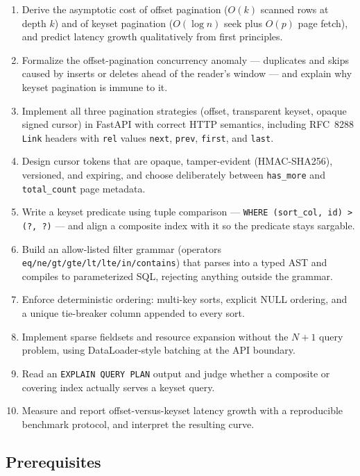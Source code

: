 \begin{enumerate}[label=\textbf{LO-\arabic*.}]
  \item Derive the asymptotic cost of offset pagination ($O(k)$ scanned rows
        at depth $k$) and of keyset pagination ($O(\log n)$ seek plus $O(p)$
        page fetch), and predict latency growth qualitatively from first
        principles.
  \item Formalize the offset-pagination concurrency anomaly --- duplicates
        and skips caused by inserts or deletes ahead of the reader's window
        --- and explain why keyset pagination is immune to it.
  \item Implement all three pagination strategies (offset, transparent
        keyset, opaque signed cursor) in FastAPI with correct HTTP semantics,
        including RFC~8288 \texttt{Link} headers with \texttt{rel} values
        \texttt{next}, \texttt{prev}, \texttt{first}, and \texttt{last}.
  \item Design cursor tokens that are opaque, tamper-evident (HMAC-SHA256),
        versioned, and expiring, and choose deliberately between
        \texttt{has\_more} and \texttt{total\_count} page metadata.
  \item Write a keyset predicate using tuple comparison ---
        \texttt{WHERE (sort\_col, id) > (?, ?)} --- and align a composite
        index with it so the predicate stays sargable.
  \item Build an allow-listed filter grammar (operators
        \texttt{eq/ne/gt/gte/lt/lte/in/contains}) that parses into a typed
        AST and compiles to parameterized SQL, rejecting anything outside
        the grammar.
  \item Enforce deterministic ordering: multi-key sorts, explicit NULL
        ordering, and a unique tie-breaker column appended to every sort.
  \item Implement sparse fieldsets and resource expansion without the
        $N{+}1$ query problem, using DataLoader-style batching at the API
        boundary.
  \item Read an \texttt{EXPLAIN QUERY PLAN} output and judge whether a
        composite or covering index actually serves a keyset query.
  \item Measure and report offset-versus-keyset latency growth with a
        reproducible benchmark protocol, and interpret the resulting curve.
\end{enumerate}

\subsection{Prerequisites}

